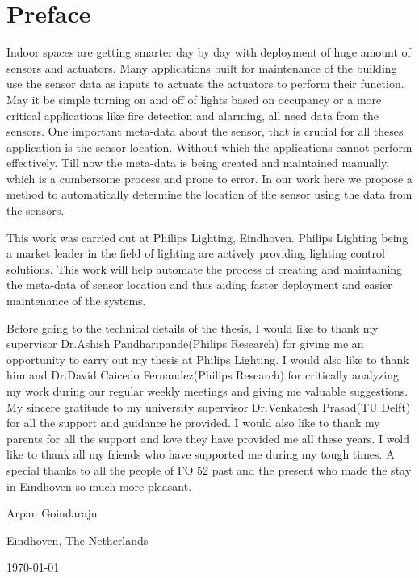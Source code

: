 \chapter*{Preface}


\vspace{1\baselineskip}

\noindent
Indoor spaces are getting smarter day by day with deployment of huge amount of sensors and actuators. Many applications built for maintenance of the building use the sensor data as inputs to actuate the actuators to perform their function. May it be simple turning on and off of lights based on occupancy or a more critical applications like fire detection and alarming, all need data from the sensors. One important meta-data about the sensor, that is crucial for all theses application is the sensor location. Without which the applications cannot perform effectively. Till now the meta-data is being created and maintained manually, which is a cumbersome process and prone to error. In our work here we propose a method to automatically determine the location of the sensor using the data from the sensors.

This work was carried out at Philips Lighting, Eindhoven. Philips Lighting being a market leader in the field of lighting are actively providing lighting control solutions. This work will help automate the process of creating and maintaining the meta-data of sensor location and thus aiding faster deployment and easier maintenance of the systems.

Before going to the technical details of the thesis, I would like to thank my supervisor Dr.Ashish Pandharipande(Philips Research) for giving me an opportunity to carry out my thesis at Philips Lighting. I would also like to thank him and Dr.David Caicedo Fernandez(Philips Research) for critically analyzing my work during our regular weekly meetings and giving me valuable suggestions. My sincere gratitude to my university supervisor Dr.Venkatesh Prasad(TU Delft) for all the support and guidance he provided. I would also like to thank my parents for all the support and love they have provided me all these years.
I wold like to thank all my friends who have supported me during my tough times.
A special thanks to all the people of FO 52 past and the present who made the stay in Eindhoven so much more pleasant.

\vspace{1\baselineskip}

\noindent
Arpan Goindaraju

\vspace{1\baselineskip}

\noindent
Eindhoven, The Netherlands

\noindent
\today
